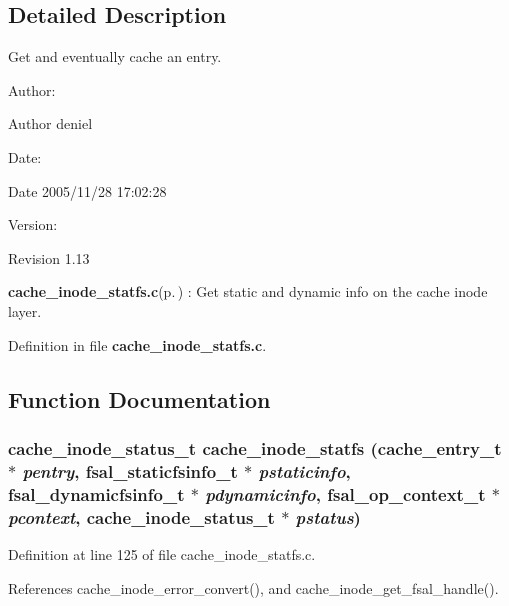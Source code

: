 \subsection{Detailed Description}
Get and eventually cache an entry. 

\begin{Desc}
\item[Author:]\begin{Desc}
\item[Author]deniel \end{Desc}
\end{Desc}
\begin{Desc}
\item[Date:]\begin{Desc}
\item[Date]2005/11/28 17:02:28 \end{Desc}
\end{Desc}
\begin{Desc}
\item[Version:]\begin{Desc}
\item[Revision]1.13 \end{Desc}
\end{Desc}
{\bf cache\_\-inode\_\-statfs.c}{\rm (p.\,\pageref{cache__inode__statfs_8c})} : Get static and dynamic info on the cache inode layer.

Definition in file {\bf cache\_\-inode\_\-statfs.c}.

\subsection{Function Documentation}
\subsubsection{\setlength{\rightskip}{0pt plus 5cm}cache\_\-inode\_\-status\_\-t cache\_\-inode\_\-statfs (cache\_\-entry\_\-t $\ast$ {\em pentry}, fsal\_\-staticfsinfo\_\-t $\ast$ {\em pstaticinfo}, fsal\_\-dynamicfsinfo\_\-t $\ast$ {\em pdynamicinfo}, fsal\_\-op\_\-context\_\-t $\ast$ {\em pcontext}, cache\_\-inode\_\-status\_\-t $\ast$ {\em pstatus})}\label{cache__inode__statfs_8c_a0}




Definition at line 125 of file cache\_\-inode\_\-statfs.c.

References cache\_\-inode\_\-error\_\-convert(), and cache\_\-inode\_\-get\_\-fsal\_\-handle().